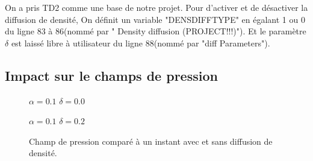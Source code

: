 \documentclass{article}
\begin{document}
On a pris TD2 comme une base de notre projet. Pour d'activer et de désactiver la diffusion de densité, On définit un variable "DENSDIFFTYPE" en égalant 1 ou 0 du ligne 83 à 86(nommé par " Density diffusion (PROJECT!!!)"). Et le paramètre $\delta$ est laissé libre à utilisateur du ligne 88(nommé par "diff Parameters").\par
  
\subsection{Impact sur le champs de pression}
\begin{figure}[h]
	\begin{minipage}[h]{0.49\linewidth}
		{$\alpha=0.1$ $\delta=0.0$}
	\end{minipage}
	\hfill
	\begin{minipage}[h]{0.49\linewidth}
		{$\alpha=0.1$ $\delta=0.2$}
	\end{minipage}
	\caption{Champ de pression comparé à un instant avec et sans diffusion de densité.}
\end{figure}
\end{document}
